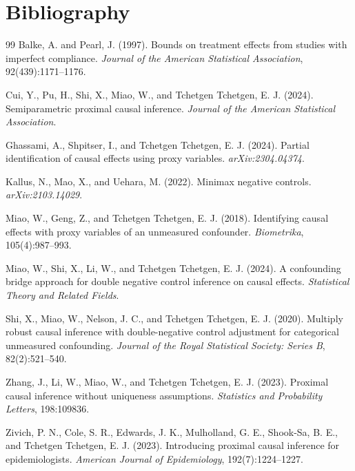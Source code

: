 \documentclass[11pt]{article}
\theoremstyle{definition}
\theoremstyle{plain}
\theoremstyle{remark}
\begin{document}
\section*{Bibliography}
\begin{thebibliography}{99}
Balke, A. and Pearl, J. (1997).
Bounds on treatment effects from studies with imperfect compliance.
\emph{Journal of the American Statistical Association}, 92(439):1171--1176.

Cui, Y., Pu, H., Shi, X., Miao, W., and Tchetgen Tchetgen, E. J. (2024).
Semiparametric proximal causal inference.
\emph{Journal of the American Statistical Association}.

Ghassami, A., Shpitser, I., and Tchetgen Tchetgen, E. J. (2024).
Partial identification of causal effects using proxy variables.
\emph{arXiv:2304.04374}.

Kallus, N., Mao, X., and Uehara, M. (2022).
Minimax negative controls.
\emph{arXiv:2103.14029}.

Miao, W., Geng, Z., and Tchetgen Tchetgen, E. J. (2018).
Identifying causal effects with proxy variables of an unmeasured confounder.
\emph{Biometrika}, 105(4):987--993.

Miao, W., Shi, X., Li, W., and Tchetgen Tchetgen, E. J. (2024).
A confounding bridge approach for double negative control inference on causal effects.
\emph{Statistical Theory and Related Fields}.

Shi, X., Miao, W., Nelson, J. C., and Tchetgen Tchetgen, E. J. (2020).
Multiply robust causal inference with double-negative control adjustment for categorical unmeasured confounding.
\emph{Journal of the Royal Statistical Society: Series B}, 82(2):521--540.

Zhang, J., Li, W., Miao, W., and Tchetgen Tchetgen, E. J. (2023).
Proximal causal inference without uniqueness assumptions.
\emph{Statistics and Probability Letters}, 198:109836.

Zivich, P. N., Cole, S. R., Edwards, J. K., Mulholland, G. E., Shook-Sa, B. E., and Tchetgen Tchetgen, E. J. (2023).
Introducing proximal causal inference for epidemiologists.
\emph{American Journal of Epidemiology}, 192(7):1224--1227.
\end{thebibliography}
\end{document}
